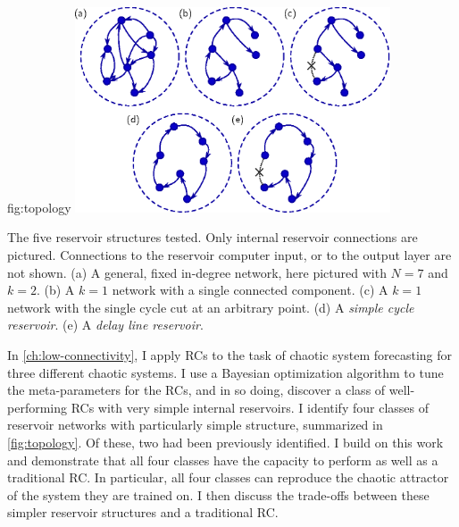 \begin{reusefigure}{fig:topology}
  \includegraphics[width=0.7\textwidth]{figures/topology}
  \caption{The five reservoir structures tested. Only internal
    reservoir connections are pictured. Connections to the reservoir
    computer input, or to the output layer are not shown. (a) A
    general, fixed in-degree network, here pictured with $N=7$ and
    $k=2$. (b) A $k=1$ network with a single connected component. (c)
    A $k=1$ network with the single cycle cut at an arbitrary
    point. (d) A \emph{simple cycle reservoir}. (e) A \emph{delay line
      reservoir}.}%
\end{reusefigure}

In \cref{ch:low-connectivity}, I apply RCs to the task of chaotic
system forecasting for three different chaotic systems. I use a
Bayesian optimization algorithm to tune the meta-parameters for the
RCs, and in so doing, discover a class of well-performing RCs with
very simple internal reservoirs. I identify four classes of reservoir
networks with particularly simple structure, summarized in
\cref{fig:topology}. Of these, two had been previously identified. I
build on this work and demonstrate that all four classes have the
capacity to perform as well as a traditional RC. In particular, all
four classes can reproduce the chaotic attractor of the system they
are trained on. I then discuss the trade-offs between these simpler
reservoir structures and a traditional RC.

